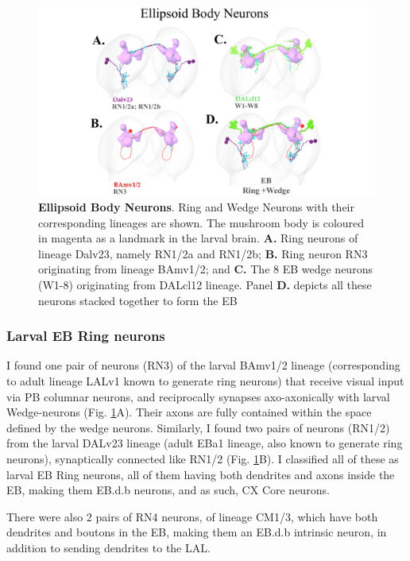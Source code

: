         \begin{figure}[H]
            \centering
            \includegraphics[width=12cm]{Figs/CX/EBneurons.pdf}
            \caption{\textbf{Ellipsoid Body Neurons}. Ring and Wedge Neurons with their corresponding lineages are shown. The mushroom body is coloured in magenta as a landmark in the larval brain. \textbf{A.} Ring neurons of lineage Dalv23, namely RN1/2a and RN1/2b; \textbf{B.} Ring neuron RN3 originating from lineage BAmv1/2; and \textbf{C.} The 8 EB wedge neurons (W1-8) originating from DALcl12 lineage. Panel \textbf{D.} depicts all these neurons stacked together to form the EB}
            \label{EBneurons}
        \end{figure}

         \subsubsection{Larval EB Ring neurons}

            I found one pair of neurons (RN3) of the larval BAmv1/2 lineage (corresponding to adult lineage LALv1 known to generate ring neurons) that receive visual input via PB columnar neurons, and reciprocally synapses axo-axonically with larval Wedge-neurons (Fig. \ref{EBneurons}A).
            Their axons are fully contained within the space defined by the wedge neurons.
            Similarly, I found two pairs of neurons (RN1/2) from the larval DALv23 lineage (adult EBa1 lineage, also known to generate ring neurons), synaptically connected like RN1/2 (Fig. \ref{EBneurons}B). I classified all of these as larval EB Ring neurons, all of them having both dendrites and axons inside the EB, making them EB.d.b neurons, and as such, CX Core neurons. 

            There were also 2 pairs of RN4 neurons, of lineage CM1/3, which have both dendrites and boutons in the EB, making them an EB.d.b intrinsic neuron, in addition to sending dendrites to the LAL.



